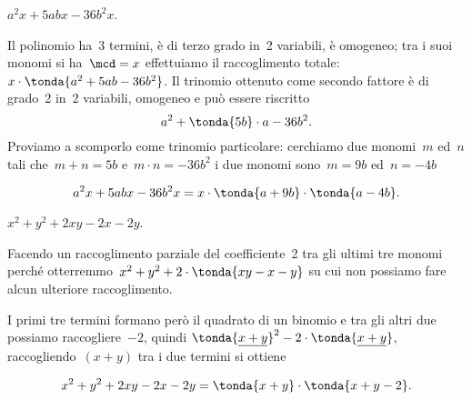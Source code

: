 % 
% 
% 
% 
% 
% 

 \begin{esempio}
 \(a^{2}x+5abx-36b^{2}x\).

Il polinomio ha~3 termini, è di terzo grado in~2 variabili, è omogeneo;
tra i suoi monomi si ha~\(\mcd= x\) effettuiamo il raccoglimento
totale:~\(x\cdot\tonda{a^{2}+5ab-36b^{2}}\).
Il trinomio ottenuto come secondo fattore è di grado~2 in~2 variabili,
omogeneo e può essere riscritto
\[a^{2}+\tonda{5b}\cdot a-36b^{2}.\]
Proviamo a scomporlo come trinomio particolare:
cerchiamo due monomi~\(m\) ed~\(n\) tali che~\(m+n=5b\)
e~\(m\cdot n=-36b^{2}\) i due monomi sono~\(m=9b\)
ed~\(n=-4b\)

\[a^{2}x+5abx-36b^{2}x=x\cdot\tonda{a+9b}\cdot \tonda{a-4b}.\]
 \end{esempio}

 \begin{esempio}
 \(x^2+y^{2}+2xy-2x-2y\).

Facendo un raccoglimento parziale del coefficiente~2 tra gli ultimi tre monomi 
perché otterremmo~\(x^2+y^{2}+2\cdot\tonda{xy-x-y}\) su cui non possiamo
fare alcun ulteriore raccoglimento.

I primi tre termini formano però il quadrato di un binomio e tra gli
altri due possiamo raccogliere~\(-2\), quindi
\(\tonda{\underline{{x+y}}}^{2}-2\cdot\tonda{\underline{{x+y}}}\),
raccogliendo~\((x + y)\) tra i due termini si ottiene

\begin{equation*}
x^2+y^{2}+2xy-2x-2y=\tonda{x+y}\cdot \tonda{x+y-2}.
\end{equation*}
 \end{esempio}

